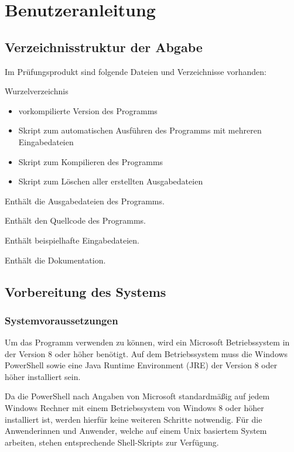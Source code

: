 \chapter{Benutzeranleitung}
\label{Benutzeranleitung}
\vspace{-0.2cm}
\section{Verzeichnisstruktur der Abgabe}
Im Prüfungsprodukt sind folgende Dateien und Verzeichnisse vorhanden:
\begin{description}
	\item [Wurzelverzeichnis]
\end{description}		
	\begin{itemize}
		\item vorkompilierte Version des Programms
		\item Skript zum automatischen Ausführen des Programms mit mehreren Eingabedateien
		\item Skript zum Kompilieren des Programms
		\item Skript zum Löschen aller erstellten Ausgabedateien
	\end{itemize}
\begin{description}
	\item [Output] Enthält die Ausgabedateien des Programms.
	\item [src] Enthält den Quellcode des Programms.
	\item [Tests] Enthält beispielhafte Eingabedateien.
	\item [Doku] Enthält die Dokumentation.
\end{description}
\vspace{-0.2cm}
\section{Vorbereitung des Systems}
\subsection{Systemvoraussetzungen}
Um das Programm verwenden zu können, wird ein Microsoft Betriebssystem in der Version 8 oder höher benötigt. Auf dem Betriebssystem muss die Windows PowerShell sowie eine Java Runtime Environment (JRE) der Version 8 oder höher installiert sein.

Da die PowerShell nach Angaben von Microsoft standardmäßig auf jedem Windows Rechner mit einem Betriebssystem von Windows 8 oder höher installiert ist, werden hierfür keine weiteren Schritte notwendig.
Für die Anwenderinnen und Anwender, welche auf einem Unix basiertem System arbeiten, stehen entsprechende Shell-Skripts zur Verfügung.

